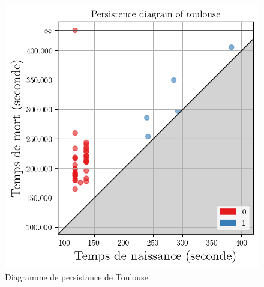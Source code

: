 \documentclass{beamer}
\begin{document}
\begin{frame}
\begin{figure}[h]
\begin{minipage}[c]{.45\linewidth}
            \includegraphics[width=1\textwidth]{../../Code/images/pd_toulouse.png}
            \caption{Diagramme de persistance de Toulouse}
        \end{minipage}
    \end{figure}
\end{frame}
\end{document}
